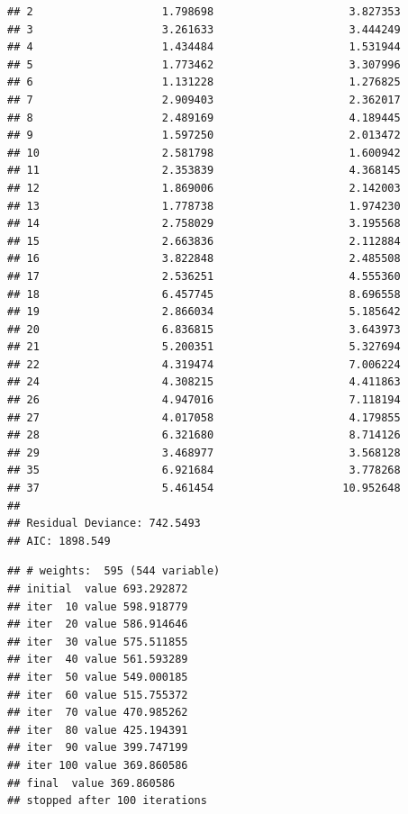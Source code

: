 \documentclass[
]{article}
\begin{document}
\begin{verbatim}
## 2                    1.798698                     3.827353
## 3                    3.261633                     3.444249
## 4                    1.434484                     1.531944
## 5                    1.773462                     3.307996
## 6                    1.131228                     1.276825
## 7                    2.909403                     2.362017
## 8                    2.489169                     4.189445
## 9                    1.597250                     2.013472
## 10                   2.581798                     1.600942
## 11                   2.353839                     4.368145
## 12                   1.869006                     2.142003
## 13                   1.778738                     1.974230
## 14                   2.758029                     3.195568
## 15                   2.663836                     2.112884
## 16                   3.822848                     2.485508
## 17                   2.536251                     4.555360
## 18                   6.457745                     8.696558
## 19                   2.866034                     5.185642
## 20                   6.836815                     3.643973
## 21                   5.200351                     5.327694
## 22                   4.319474                     7.006224
## 24                   4.308215                     4.411863
## 26                   4.947016                     7.118194
## 27                   4.017058                     4.179855
## 28                   6.321680                     8.714126
## 29                   3.468977                     3.568128
## 35                   6.921684                     3.778268
## 37                   5.461454                    10.952648
## 
## Residual Deviance: 742.5493 
## AIC: 1898.549
\end{verbatim}

\begin{verbatim}
## # weights:  595 (544 variable)
## initial  value 693.292872 
## iter  10 value 598.918779
## iter  20 value 586.914646
## iter  30 value 575.511855
## iter  40 value 561.593289
## iter  50 value 549.000185
## iter  60 value 515.755372
## iter  70 value 470.985262
## iter  80 value 425.194391
## iter  90 value 399.747199
## iter 100 value 369.860586
## final  value 369.860586 
## stopped after 100 iterations
\end{verbatim}
\end{document}
